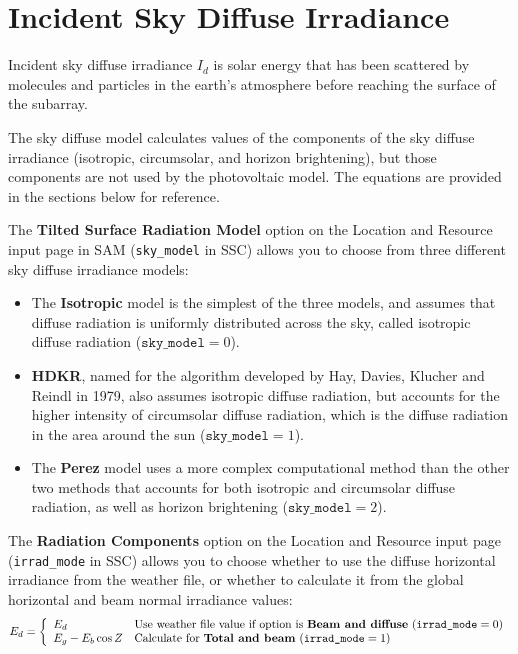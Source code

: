 \documentclass[12pt,letterpaper]{article}
\begin{document}
\section{Incident Sky Diffuse Irradiance}

Incident sky diffuse irradiance $I_d$ is solar energy that has been scattered by molecules and particles in the earth's atmosphere before reaching the surface of the subarray.

The sky diffuse model calculates values of the components of the sky diffuse irradiance (isotropic, circumsolar, and horizon brightening), but those components are not used by the photovoltaic model. The equations are provided in the sections below for reference.%

The \textbf{Tilted Surface Radiation Model} option on the Location and Resource input page in SAM (\texttt{sky\_model} in SSC) allows you to choose from three different sky diffuse irradiance models:

\begin{itemize}
\item The \textbf{Isotropic} model is the simplest of the three models, and assumes that diffuse radiation is uniformly distributed across the sky, called isotropic diffuse radiation ($\mathtt{sky\_model} = 0$).
\item \textbf{HDKR}, named for the algorithm developed by Hay, Davies, Klucher and Reindl in 1979, also assumes isotropic diffuse radiation, but accounts for the higher intensity of circumsolar diffuse radiation, which is the diffuse radiation in the area around the sun ($\mathtt{sky\_model} = 1$).
\item The \textbf{Perez} model uses a more complex computational method than the other two methods that accounts for both isotropic and circumsolar diffuse radiation, as well as horizon brightening ($\mathtt{sky\_model} = 2$). 
\end{itemize}

The \textbf{Radiation Components} option on the Location and Resource input page (\texttt{irrad\_mode} in SSC) allows you to choose whether to use the diffuse horizontal irradiance from the weather file, or whether to calculate it from the global horizontal and beam normal irradiance values:
\begin{equation}\label{eqn-diffhoriz}
E_d = \left\{
\begin{array}{ll}
E_d & \text{Use weather file value if option is \textbf{Beam and diffuse} ($\texttt{irrad\_mode}=0)$}\\
E_g - E_b\cos Z & \text{Calculate for \textbf{Total and beam} ($\texttt{irrad\_mode}=1)$}
\end{array}
\right.
\end{equation}
\end{document}
